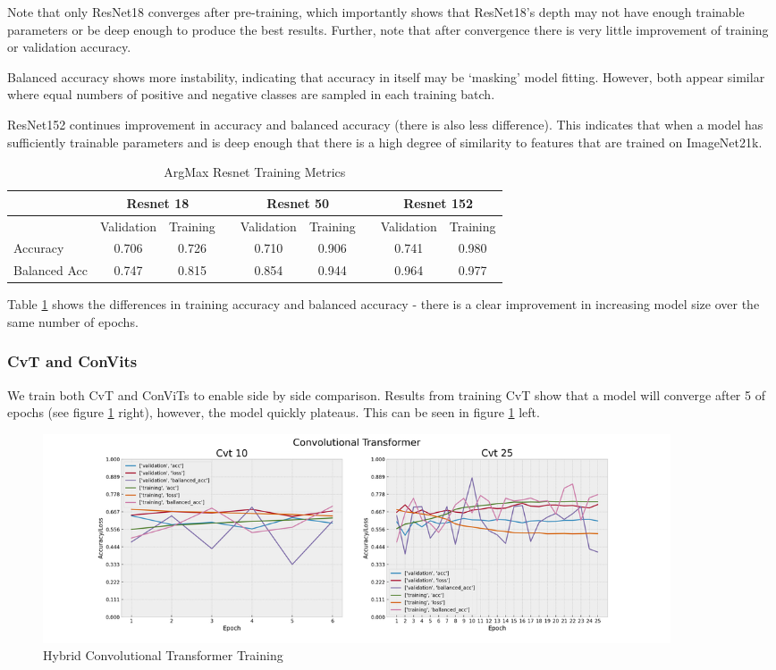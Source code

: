 Note that only ResNet18 converges after pre-training, which importantly shows that ResNet18's depth may not have enough trainable parameters or be deep enough to produce the best results. Further, note that after convergence there is very little improvement of training or validation accuracy. 

Balanced accuracy shows more instability, indicating that accuracy in itself may be `masking' model fitting. However, both appear similar where equal numbers of positive and negative classes are sampled in each training batch. 

ResNet152 continues improvement in accuracy and balanced accuracy (there is also less difference). This indicates that when a model has sufficiently trainable parameters and is deep enough that there is a high degree of similarity to features that are trained on ImageNet21k. 

\begin{table}[ht!]
\centering
\small 
\begin{tabular}{lcccccccc}
\toprule
{} & \multicolumn{2}{c}{Resnet 18} & {}& \multicolumn{2}{c}{Resnet 50} & {}& \multicolumn{2}{c}{Resnet 152} \\ 
 \midrule
{} & Validation & Training &{} & Validation & Training &{} & Validation & Training \\
\cline{2-3} \cline{5-6} \cline{8-9}
Accuracy &      0.706 &    0.726 & &      0.710 &    0.906 & &      0.741 &    0.980 \\
Balanced Acc &      0.747 &    0.815 & &      0.854 &    0.944 & &    0.964 &    0.977 \\
\bottomrule
\end{tabular}
\caption{ArgMax Resnet Training Metrics}
\label{tab:resnet train}
\end{table}


Table \ref{tab:resnet train} shows the differences in training accuracy and balanced accuracy - there is a clear improvement in increasing model size over the same number of epochs. 

\subsubsection{CvT and ConVits}

We train both CvT\cite{Wu2021} and ConViTs to enable side by side comparison. Results from training CvT\cite{Wu2021} show that a model will converge after 5 of epochs (see figure \ref{fig:CvT} right), however, the model quickly plateaus. This can be seen in figure \ref{fig:CvT} left.
\begin{figure}[htp!]
    \centering
    \includegraphics[width=0.9\textwidth]{figures/results_and_discussion/CVT.png}
    \caption{Hybrid Convolutional Transformer Training}
    \label{fig:CvT}
\end{figure} 

